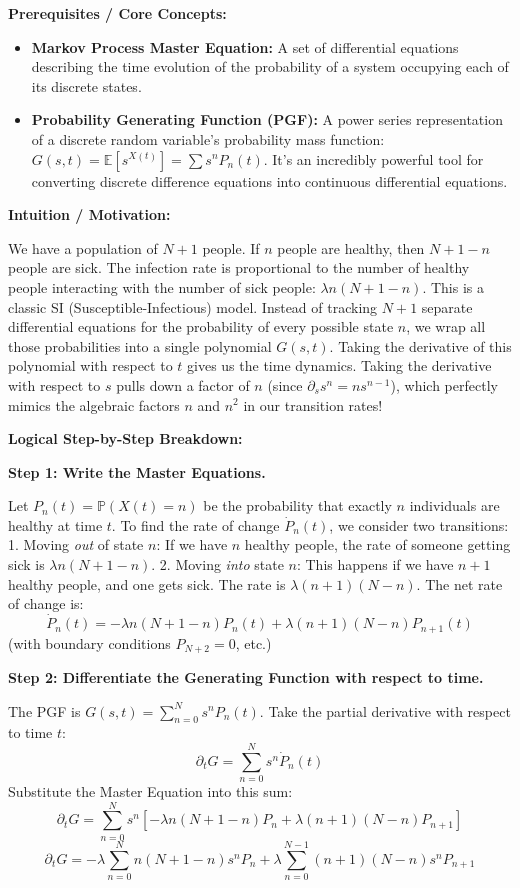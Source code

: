 \begin{solution}
\textbf{Prerequisites / Core Concepts:}
\begin{itemize}
    \item \textbf{Markov Process Master Equation:} A set of differential equations describing the time evolution of the probability of a system occupying each of its discrete states.
    \item \textbf{Probability Generating Function (PGF):} A power series representation of a discrete random variable's probability mass function: $G(s,t) = \mathbb{E}[s^{X(t)}] = \sum s^n P_n(t)$. It's an incredibly powerful tool for converting discrete difference equations into continuous differential equations.
\end{itemize}

\textbf{Intuition / Motivation:}

We have a population of $N+1$ people. If $n$ people are healthy, then $N+1-n$ people are sick. The infection rate is proportional to the number of healthy people interacting with the number of sick people: $\lambda n (N+1-n)$. This is a classic SI (Susceptible-Infectious) model.
Instead of tracking $N+1$ separate differential equations for the probability of every possible state $n$, we wrap all those probabilities into a single polynomial $G(s,t)$. Taking the derivative of this polynomial with respect to $t$ gives us the time dynamics. Taking the derivative with respect to $s$ pulls down a factor of $n$ (since $\partial_s s^n = n s^{n-1}$), which perfectly mimics the algebraic factors $n$ and $n^2$ in our transition rates!

\textbf{Logical Step-by-Step Breakdown:}

\textbf{Step 1: Write the Master Equations.}

Let $P_n(t) = \mathbb{P}(X(t) = n)$ be the probability that exactly $n$ individuals are healthy at time $t$.
To find the rate of change $\dot{P}_n(t)$, we consider two transitions:
1. Moving \textit{out} of state $n$: If we have $n$ healthy people, the rate of someone getting sick is $\lambda n(N+1-n)$.
2. Moving \textit{into} state $n$: This happens if we have $n+1$ healthy people, and one gets sick. The rate is $\lambda (n+1)(N - n)$.
The net rate of change is:
\[ \dot{P}_n(t) = -\lambda n(N+1-n) P_n(t) + \lambda (n+1)(N-n) P_{n+1}(t) \]
(with boundary conditions $P_{N+2} = 0$, etc.)

\textbf{Step 2: Differentiate the Generating Function with respect to time.}

The PGF is $G(s,t) = \sum_{n=0}^N s^n P_n(t)$.
Take the partial derivative with respect to time $t$:
\[ \partial_t G = \sum_{n=0}^N s^n \dot{P}_n(t) \]
Substitute the Master Equation into this sum:
\[ \partial_t G = \sum_{n=0}^N s^n \left[ -\lambda n(N+1-n) P_n + \lambda (n+1)(N-n) P_{n+1} \right] \]
\[ \partial_t G = -\lambda \sum_{n=0}^N n(N+1-n) s^n P_n + \lambda \sum_{n=0}^{N-1} (n+1)(N-n) s^n P_{n+1} \]


\end{solution}
